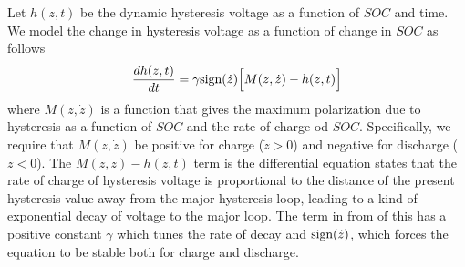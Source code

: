 \documentclass[12pt,a4paper]{scrartcl}
\begin{document}
\begin{onehalfspace}
Let $h(z,t)$ be the dynamic hysteresis voltage as a function of $SOC$ and time. We model the change in hysteresis voltage as a function of change in $SOC$ as follows
\begin{equation}
	\frac{dh(z,t)}{dt} = \gamma\text{sign}(\dot{z})\Big[M(z,\dot{z})-h(z,t)\Big]
\end{equation}
where $M(z,\dot{z})$ is a function that gives the maximum polarization due to hysteresis as a function of $SOC$ and the rate of charge od $SOC$.
Specifically, we require that $M(z,\dot{z})$ be positive for charge ($\dot{z}>0$) and negative for discharge ($\dot{z}<0$). The $M(z,\dot{z})-h(z,t)$ term is the differential equation states that the rate of charge of hysteresis voltage is proportional to the distance of the present hysteresis value away from the major hysteresis loop, leading to a kind of exponential decay of voltage to the major loop. The term in from of this has a positive constant $\gamma$ which tunes the rate of decay and $\text{sign}(\dot{z})$, which forces the equation to be stable both for charge and discharge.


\end{onehalfspace}
\end{document}
